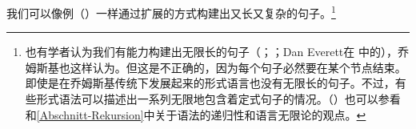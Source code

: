 \noindent
我们可以像例（）一样通过扩展的方式构建出又长又复杂的句子。\footnote{%
也有学者认为我们有能力构建出无限长的句子（\citealp*[]{NKN2001a}；\citealp[]{KS2008a-u}；Dan Everett在 中的），乔姆斯基也这样认为\citep[]{Leiss2003a}。但这是不正确的，因为每个句子必然要在某个节点结束。即使是在乔姆斯基传统下发展起来的形式语言也没有无限长的句子。不过，有些形式语法可以描述出一系列无限地包含着定式句子的情况。（\citealp[]{Chomsky57a}）也可以参看 和\ref{Abschnitt-Rekursion}中关于语法的递归性和语言无限论的观点。
}


